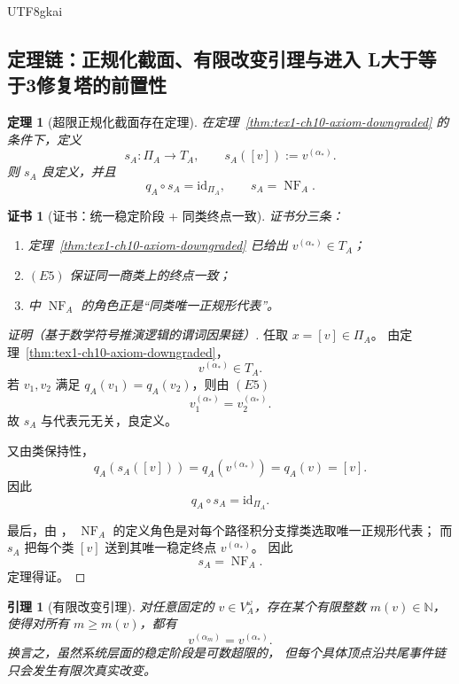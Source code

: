 \documentclass[12pt]{article}
\newtheorem{theorem}{定理}[section]
\newtheorem{lemma}{引理}[section]
\newtheorem{Certificate}{证书}[section]
\newcommand{\NN}{\mathbb{N}}
\newcommand{\id}{\mathrm{id}}
\begin{document}
\begin{CJK*}{UTF8}{gkai}
\subsection{定理链：正规化截面、有限改变引理与进入 L大于等于3修复塔的前置性}
\label{subsec:tex1-ch10-theorems}

\begin{theorem}[超限正规化截面存在定理]
\label{thm:tex1-ch10-section}
在定理~\ref{thm:tex1-ch10-axiom-downgraded} 的条件下，定义
\[
  s_A:\Pi_A\to T_A,
  \qquad
  s_A([v]):=v^{(\alpha_\ast)}.
\]
则 \(s_A\) 良定义，并且
\[
  q_A\circ s_A=\id_{\Pi_A},
  \qquad
  s_A=\operatorname{NF}_A.
\]
\end{theorem}

\begin{Certificate}[证书：统一稳定阶段 + 同类终点一致]
\label{cert:tex1-ch10-section}
证书分三条：
\begin{enumerate}
  \item 定理~\ref{thm:tex1-ch10-axiom-downgraded} 已给出 \(v^{(\alpha_\ast)}\in T_A\)；
  \item \((E5)\) 保证同一商类上的终点一致；
  \item \cite{RepoTex36HomotopyTwistEquivalence} 中 \(\operatorname{NF}_A\) 的角色正是“同类唯一正规形代表”。
\end{enumerate}
\end{Certificate}

\begin{proof}[证明（基于数学符号推演逻辑的谓词因果链）]
任取 \(x=[v]\in\Pi_A\)。
由定理~\ref{thm:tex1-ch10-axiom-downgraded}，
\[
  v^{(\alpha_\ast)}\in T_A.
\]
若 \(v_1,v_2\) 满足 \(q_A(v_1)=q_A(v_2)\)，则由 \((E5)\)
\[
  v_1^{(\alpha_\ast)}=v_2^{(\alpha_\ast)}.
\]
故 \(s_A\) 与代表元无关，良定义。

又由类保持性，
\[
  q_A(s_A([v]))
  =
  q_A(v^{(\alpha_\ast)})
  =
  q_A(v)
  =
  [v].
\]
因此
\[
  q_A\circ s_A=\id_{\Pi_A}.
\]

最后，由 \cite{RepoTex36HomotopyTwistEquivalence}，
\(\operatorname{NF}_A\) 的定义角色是对每个路径积分支撑类选取唯一正规形代表；
而 \(s_A\) 把每个类 \([v]\) 送到其唯一稳定终点 \(v^{(\alpha_\ast)}\)。
因此
\[
  s_A=\operatorname{NF}_A.
\]
定理得证。
\end{proof}

\begin{lemma}[有限改变引理]
\label{lem:tex1-ch10-finite-change}
对任意固定的 \(v\in V_A^\omega\)，存在某个有限整数 \(m(v)\in\NN\)，使得对所有 \(m\ge m(v)\)，都有
\[
  v^{(\alpha_m)}=v^{(\alpha_\ast)}.
\]
换言之，虽然系统层面的稳定阶段是可数超限的，
但每个具体顶点沿共尾事件链只会发生有限次真实改变。
\end{lemma}


\end{CJK*}
\end{document}
